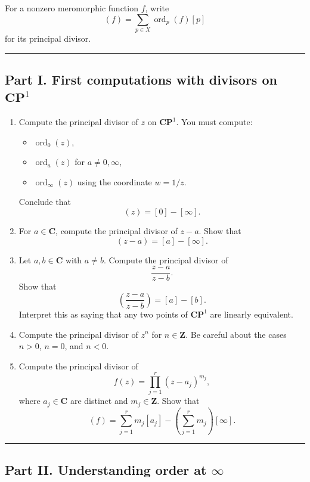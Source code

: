 \documentclass[11pt,openany]{article}
\begin{document}
For a nonzero meromorphic function \(f\), write
\[
(f)=\sum_{p\in X}\operatorname{ord}_p(f)[p]
\]
for its principal divisor.

\bigskip

\hrule

\bigskip

\subsection*{Part I. First computations with divisors on \(\mathbf{CP}^1\)}

\begin{enumerate}
	\item Compute the principal divisor of \(z\) on \(\mathbf{CP}^1\).  
	You must compute:
	\begin{itemize}
		\item \(\operatorname{ord}_0(z)\),
		\item \(\operatorname{ord}_a(z)\) for \(a\neq 0,\infty\),
		\item \(\operatorname{ord}_\infty(z)\) using the coordinate \(w=1/z\).
	\end{itemize}
	Conclude that
	\[
	(z)=[0]-[\infty].
	\]
	
	\item For \(a\in\mathbf{C}\), compute the principal divisor of \(z-a\).  
	Show that
	\[
	(z-a)=[a]-[\infty].
	\]
	
	\item Let \(a,b\in\mathbf{C}\) with \(a\neq b\). Compute the principal divisor of
	\[
	\frac{z-a}{z-b}.
	\]
	Show that
	\[
	\left(\frac{z-a}{z-b}\right)=[a]-[b].
	\]
	Interpret this as saying that any two points of \(\mathbf{CP}^1\) are linearly equivalent.
	
	\item Compute the principal divisor of \(z^n\) for \(n\in\mathbf{Z}\).  
	Be careful about the cases \(n>0\), \(n=0\), and \(n<0\).
	
	\item Compute the principal divisor of
	\[
	f(z)=\prod_{j=1}^r (z-a_j)^{m_j},
	\]
	where \(a_j\in \mathbf{C}\) are distinct and \(m_j\in\mathbf{Z}\).  
	Show that
	\[
	(f)=\sum_{j=1}^r m_j[a_j]-\left(\sum_{j=1}^r m_j\right)[\infty].
	\]
\end{enumerate}

\bigskip
\hrule
\bigskip

\subsection*{Part II. Understanding order at \texorpdfstring{$\infty$}{infinity}}
\end{document}
